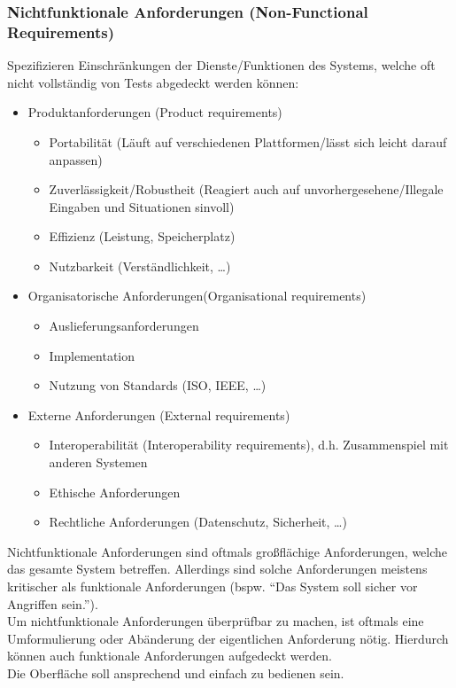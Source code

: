 \documentclass[
    ngerman,
    color=3b,
    summary,
    boxarc,
    main,
]{rubos-tuda-template}
\begin{document}
\subsubsection{Nichtfunktionale Anforderungen (Non-Functional Requirements)}\label{Non-Functional Requirements}
Spezifizieren Einschränkungen der Dienste/Funktionen des Systems, welche oft nicht vollständig von Tests abgedeckt werden können:
\begin{itemize}
    \item Produktanforderungen (Product requirements)\begin{itemize}
              \item Portabilität (Läuft auf verschiedenen Plattformen/lässt sich leicht darauf anpassen)
              \item Zuverlässigkeit/Robustheit (Reagiert auch auf unvorhergesehene/Illegale Eingaben und Situationen sinvoll)
              \item Effizienz (Leistung, Speicherplatz)
              \item Nutzbarkeit (Verständlichkeit, \dots)
          \end{itemize}
    \item Organisatorische Anforderungen(Organisational requirements)\begin{itemize}
              \item Auslieferungsanforderungen
              \item Implementation
              \item Nutzung von Standards (ISO, IEEE, \dots)
          \end{itemize}
    \item Externe Anforderungen (External requirements)\begin{itemize}
              \item Interoperabilität (Interoperability requirements), d.h. Zusammenspiel mit anderen Systemen
              \item Ethische Anforderungen
              \item Rechtliche Anforderungen (Datenschutz, Sicherheit, \dots)
          \end{itemize}
\end{itemize}
Nichtfunktionale Anforderungen sind oftmals großflächige Anforderungen, welche das gesamte System betreffen. Allerdings sind solche Anforderungen meistens kritischer als funktionale Anforderungen
(bspw. "`Das System soll sicher vor Angriffen sein."').\\
Um nichtfunktionale Anforderungen überprüfbar zu machen, ist oftmals eine Umformulierung oder
Abänderung der eigentlichen Anforderung nötig. Hierdurch können auch funktionale Anforderungen
aufgedeckt werden.\\
 Die Oberfläche soll ansprechend und einfach zu bedienen sein.
\clearpage
\end{document}
